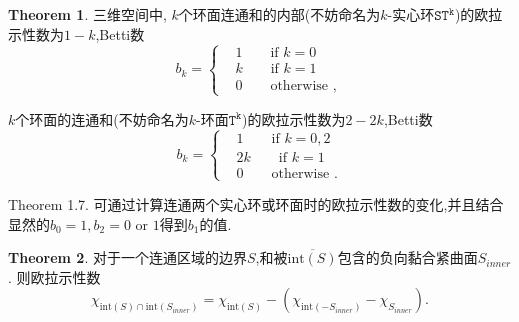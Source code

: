 \documentclass[a4paper]{book}
\numberwithin{equation}{chapter}
\theoremstyle{definition}
\newtheorem{thm}{Theorem}[chapter]
\begin{document}
\begin{thm}
    三维空间中, $k$个环面连通和的内部(不妨命名为$k$-实心环$\mathtt{ST^k}$)的欧拉示性数为$1 - k$,Betti数
    \begin{equation*}
        b_k = \left\{ 
        \begin{aligned}
            &1 \qquad \text{if } k = 0 \\
            &k \qquad \text{if } k = 1 \\
            &0 \qquad \text{otherwise },
        \end{aligned}
        \right.
    \end{equation*}
    
    $k$个环面的连通和(不妨命名为$k$-环面$\mathtt{T^k}$)的欧拉示性数为$2 - 2k$,Betti数
    \begin{equation*}
        b_k = \left\{ 
        \begin{aligned}
            &1 \qquad \text{if } k = 0,2 \\
            &2k \qquad \text{if } k = 1 \\
            &0 \qquad \text{otherwise }.
        \end{aligned}
        \right.
    \end{equation*}
\end{thm}

Theorem 1.7. 可通过计算连通两个实心环或环面时的欧拉示性数的变化,并且结合显然的$b_0 = 1,
b_2 = 0 \text{ or } 1$得到$b_1$的值.

\begin{thm}
    对于一个连通区域的边界$S$,和被$\overline{\text{int}(S)}$包含的负向黏合紧曲面$S_{inner}$.
    则欧拉示性数
    \begin{equation}
        \chi_{\text{int}(S) \cap \text{int}(S_{inner})} = \chi_{\text{int}(S)}
        - (\chi_{\text{int}(-S_{inner})} - \chi_{S_{inner}}).
    \end{equation}
\end{thm}
\end{document}
